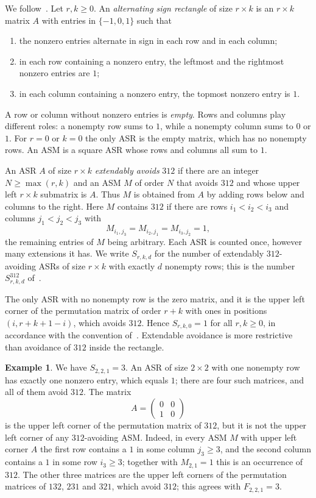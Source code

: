 \documentclass{amsart}
\theoremstyle{definition}
\newtheorem{example}[theorem]{Example}
\theoremstyle{remark}
\numberwithin{equation}{section}
\begin{document}
We follow~\cite[Section~2]{HKL}. Let $r,k\ge0$. An \emph{alternating sign rectangle} of size $r\times k$ is an $r\times k$ matrix $A$ with entries in $\{-1,0,1\}$ such that
\begin{enumerate}
\item the nonzero entries alternate in sign in each row and in each column;
\item in each row containing a nonzero entry, the leftmost and the rightmost nonzero entries are $1$;
\item in each column containing a nonzero entry, the topmost nonzero entry is $1$.
\end{enumerate}
A row or column without nonzero entries is \emph{empty}. Rows and columns play different roles: a nonempty row sums to $1$, while a nonempty column sums to $0$ or $1$. For $r=0$ or $k=0$ the only ASR is the empty matrix, which has no nonempty rows. An ASM is a square ASR whose rows and columns all sum to $1$.

An ASR $A$ of size $r\times k$ \emph{extendably avoids} $312$ if there are an integer $N\ge\max(r,k)$ and an ASM $M$ of order $N$ that avoids $312$ and whose upper left $r\times k$ submatrix is $A$. Thus $M$ is obtained from $A$ by adding rows below and columns to the right. Here $M$ contains $312$ if there are rows $i_1<i_2<i_3$ and columns $j_1<j_2<j_3$ with
\[
M_{i_1,j_3}=M_{i_2,j_1}=M_{i_3,j_2}=1,
\]
the remaining entries of $M$ being arbitrary. Each ASR is counted once, however many extensions it has. We write $S_{r,k,d}$ for the number of extendably $312$-avoiding ASRs of size $r\times k$ with exactly $d$ nonempty rows; this is the number $S^{312}_{r,k,d}$ of~\cite{HKL}.

The only ASR with no nonempty row is the zero matrix, and it is the upper left corner of the permutation matrix of order $r+k$ with ones in positions $(i,r+k+1-i)$, which avoids $312$. Hence $S_{r,k,0}=1$ for all $r,k\ge0$, in accordance with the convention of~\cite[Section~4]{HKL}. Extendable avoidance is more restrictive than avoidance of $312$ inside the rectangle.

\begin{example}\label{ex:221}
We have $S_{2,2,1}=3$. An ASR of size $2\times2$ with one nonempty row has exactly one nonzero entry, which equals $1$; there are four such matrices, and all of them avoid $312$. The matrix
\[
A=\begin{pmatrix}0&0\\1&0\end{pmatrix}
\]
is the upper left corner of the permutation matrix of $312$, but it is not the upper left corner of any $312$-avoiding ASM. Indeed, in every ASM $M$ with upper left corner $A$ the first row contains a $1$ in some column $j_3\ge3$, and the second column contains a $1$ in some row $i_3\ge3$; together with $M_{2,1}=1$ this is an occurrence of $312$. The other three matrices are the upper left corners of the permutation matrices of $132$, $231$ and $321$, which avoid $312$; this agrees with $F_{2,2,1}=3$.
\end{example}
\end{document}
